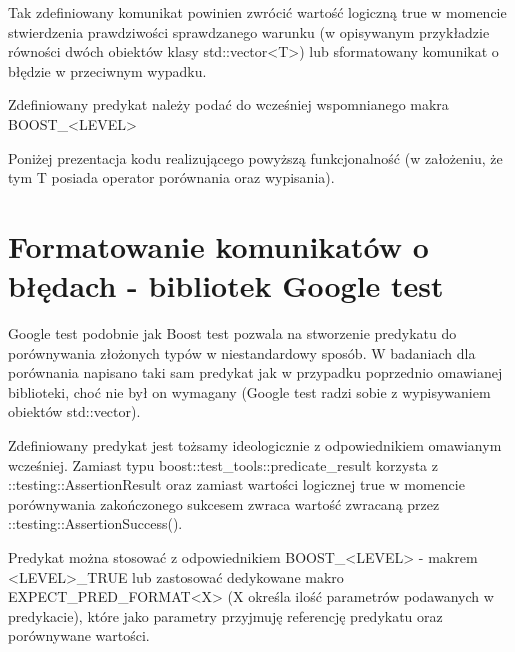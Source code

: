 \documentclass[12pt,a4paper,notitlepage]{report}
\begin{document}
Tak zdefiniowany komunikat powinien zwrócić wartość logiczną true w momencie stwierdzenia prawdziwości sprawdzanego warunku (w opisywanym przykładzie równości dwóch obiektów klasy std::vector<T>) lub sformatowany komunikat o błędzie w przeciwnym wypadku.

Zdefiniowany predykat należy podać do wcześniej wspomnianego makra BOOST{\_}<LEVEL>

Poniżej prezentacja kodu realizującego powyższą funkcjonalność (w założeniu, że tym T posiada operator porównania oraz wypisania).

			

\section{Formatowanie komunikatów o błędach - bibliotek Google test}

Google test podobnie jak Boost test pozwala na stworzenie predykatu do porównywania złożonych typów w niestandardowy sposób. W badaniach dla porównania napisano taki sam predykat jak w przypadku poprzednio omawianej biblioteki, choć nie był on wymagany (Google test radzi sobie z wypisywaniem obiektów std::vector).

Zdefiniowany predykat jest tożsamy ideologicznie z odpowiednikiem omawianym wcześniej. Zamiast typu boost::test{\_}tools::predicate{\_}result korzysta z ::testing::AssertionResult oraz zamiast wartości logicznej true w momencie porównywania zakończonego sukcesem zwraca wartość zwracaną przez ::testing::AssertionSuccess().

Predykat można stosować z odpowiednikiem BOOST{\_}<LEVEL> - makrem <LEVEL>{\_}TRUE lub zastosować dedykowane makro EXPECT{\_}PRED{\_}FORMAT<X> (X określa ilość parametrów podawanych w predykacie), które jako parametry przyjmuję referencję predykatu oraz porównywane wartości.

			
\end{document}
